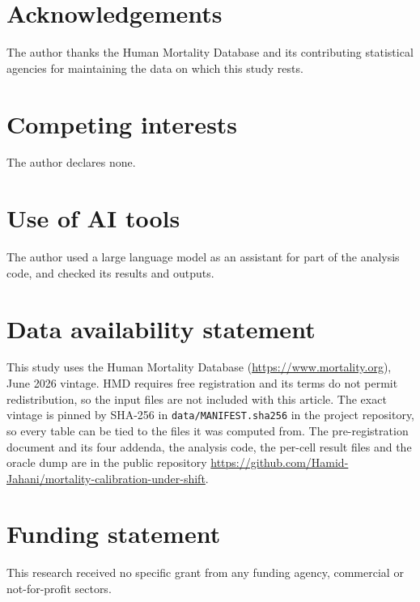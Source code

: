 
\section*{Acknowledgements}
The author thanks the Human Mortality Database and its contributing statistical agencies for
maintaining the data on which this study rests.

\section*{Competing interests}
The author declares none.

\section*{Use of AI tools}
The author used a large language model as an assistant for part of the analysis code, and
checked its results and outputs.

\section*{Data availability statement}
This study uses the Human Mortality Database (\url{https://www.mortality.org}), June 2026
vintage. HMD requires free registration and its terms do not permit redistribution, so the
input files are not included with this article. The exact vintage is pinned by SHA-256 in
\texttt{data/MANIFEST.sha256} in the project repository, so every table can be tied to the
files it was computed from. The pre-registration document and its four addenda, the analysis
code, the per-cell result files and the  oracle dump are in the public
repository \url{https://github.com/Hamid-Jahani/mortality-calibration-under-shift}.

\section*{Funding statement}
This research received no specific grant from any funding agency, commercial or not-for-profit
sectors.
